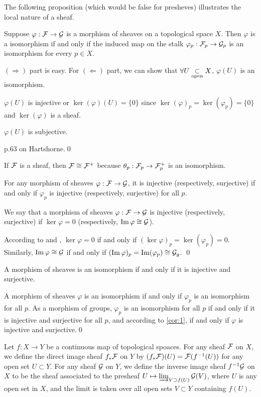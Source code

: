 \documentclass[12pt]{extbook}
\begin{document}
The following proposition (which would be false for presheves) illustrates the local nature of a sheaf.

\pro \label{pro:1}Suppose $\varphi:\mathcal{F}\to\mathcal{G}$ is a morphism of sheaves on a topological space $X$. Then $\varphi$ is a isomorphism if and only if the induced map on the stalk $\varphi_p:\mathcal{F}_p\to \mathcal{G}_p$ is an isomorphism for every $p\in X$.

\proof $(\Rightarrow)$ part is easy. For $(\Leftarrow)$ part, we can show that $\forall U\underset{\mathrm{open}}{\subset} X$, $\varphi(U)$ is an isomorphism.

$\varphi(U)$ is injective or $\ker(\varphi)(U)=\{0\}$ since $\ker(\varphi)_p=\ker(\varphi_p)=\{0\}$ and $\ker(\varphi)$ is a sheaf.

$\varphi(U)$ is subjective.

p.63 on Hartshorne.\qed

\para If $\mathcal{F}$ is a sheaf, then $\mathcal{F}\cong \mathcal{F}^+$ because $\theta_p:\mathcal{F}_p\to \mathcal{F}^+_p$ is an isomorphism.

\para  \label{cor:1} For any morphism of sheaves $\varphi:\mathcal{F}\to\mathcal{G}$, it is injective (respectively, surjective) if and only if $\varphi_p$ is injective (respectively, surjective) for all $p$.

\para We say that a morphism of sheaves $\varphi:\mathcal{F}\to\mathcal{G}$ is injective (respectively, surjective) if $\ker\varphi=0$ (respectively, $\operatorname{Im}\varphi\cong\mathcal{G}$).

\proof According to  and , $\ker \varphi=0$ if and only if $(\ker \varphi)_p=\ker(\varphi_p)=0$. Similarly, $\operatorname{Im} \varphi\cong \mathcal{G}$ if and only if $(\operatorname{Im} \varphi)_p=\operatorname{Im}(\varphi_p)\cong \mathcal{G}_g$. \qed

\para A morphism of sheaves is an isomorphism if and only if it is injective and surjective.

\proof A morphism of sheaves $\varphi$ is an isomorphism if and only if $\varphi_p$ is an isomorphism for all $p$. As a morphism of groups, $\varphi_p$ is an isomorphism for all $p$ if and only if it is injective and surjective for all $p$, and according to \eqref{cor:1}, if and only if $\varphi$ is injective and surjective.\qed

\para Let $f:X\to Y$ be a continuous map of topological spoaces. For any sheaf $\mathcal{F}$ on $X$, we define the direct image sheaf $f_*\mathcal{F}$ on $Y$ by $(f_*\mathcal{F})(U)=\mathcal{F}(f^{-1}(U))$ for any open set $U\subset Y$. For any sheaf $\mathcal{G}$ on $Y$, we define the inverse image sheaf $f^{-1}\mathcal{G}$ on $X$ to be the sheaf associated to the presheaf $U\mapsto \varinjlim_{V \supset f(U)}\mathcal{G}(V)$, where $U$ is any open set in $X$, and the limit is taken over all open sets $V\subset Y$ containing $f(U)$. 
\end{document}
